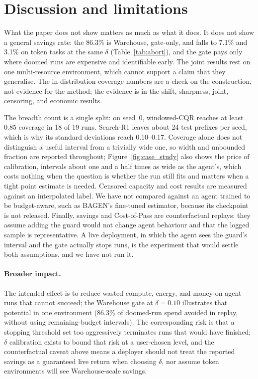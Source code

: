 \documentclass{article}
\begin{document}
\flushbottom
\section{Discussion and limitations}
\label{sec:discussion}

What the paper does not show matters as much as what it does. It does not show a general savings rate: the 86.3\% is Warehouse, gate-only, and falls to 7.1\% and 3.1\% on token tasks at the same $\delta$ (Table~\ref{tab:abort}), and the gate pays only where doomed runs are expensive and identifiable early. The joint results rest on one multi-resource environment, which cannot support a claim that they generalise. The in-distribution coverage numbers are a check on the construction, not evidence for the method; the evidence is in the shift, sharpness, joint, censoring, and economic results.

The breadth count is a single split: on seed~0, windowed-CQR reaches at least 0.85 coverage in 18 of 19 runs. Search-R1 leaves about 24 test prefixes per seed, which is why its standard deviations reach 0.10--0.17. Coverage alone does not distinguish a useful interval from a trivially wide one, so width and unbounded fraction are reported throughout; Figure~\ref{fig:case_study} also shows the price of calibration, intervals about one and a half times as wide as the agent's, which costs nothing when the question is whether the run still fits and matters when a tight point estimate is needed. Censored capacity and cost results are measured against an interpolated label. We have not compared against an agent trained to be budget-aware, such as BAGEN's fine-tuned estimator, because its checkpoint is not released. Finally, savings and Cost-of-Pass are counterfactual replays: they assume adding the guard would not change agent behaviour and that the logged sample is representative. A live deployment, in which the agent sees the guard's interval and the gate actually stops runs, is the experiment that would settle both assumptions, and we have not run it.

\paragraph{Broader impact.}
The intended effect is to reduce wasted compute, energy, and money on agent runs that cannot succeed; the Warehouse gate at $\delta{=}0.10$ illustrates that potential in one environment (86.3\% of doomed-run spend avoided in replay, without using remaining-budget intervals). The corresponding risk is that a stopping threshold set too aggressively terminates runs that would have finished; $\delta$ calibration exists to bound that risk at a user-chosen level, and the counterfactual caveat above means a deployer should not treat the reported savings as a guaranteed live return when choosing $\delta$, nor assume token environments will see Warehouse-scale savings.
\end{document}
